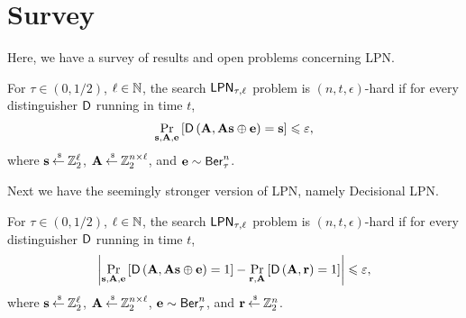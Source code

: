 \section{Survey}
Here, we have a survey of results and open problems concerning LPN.

\begin{definition}
	For $\tau \in (0,1/2)$, $\ell \in {\mathbb N}$, the search $\mathsf{LPN}_{\tau, \ell}$ problem is $(n, t, \epsilon)$-hard if for every distinguisher $\mathsf{D}$ running in time $t$,
	\begin{align*}
		\underset{\mathbf{s}, \mathbf{A}, \mathbf{e}}{\mathop{\mathrm{Pr}}}\left[\mathsf{D}\left(\mathbf{A}, \mathbf{As}\oplus\mathbf{e}\right)=\mathbf{s}\right] \leqslant \varepsilon,
	\end{align*}
	where $\mathbf{s} \mathbin{\stackrel{\mbox{\,\tiny \$}}{\gets}} {\mathbb Z}^\ell_2$, $\mathbf{A} \mathbin{\stackrel{\mbox{\,\tiny \$}}{\gets}} {\mathbb Z}^{n\times \ell}_2$, and $\mathbf{e} \sim \mathsf{Ber}^n_\tau$.
\end{definition}
Next we have the seemingly stronger version of LPN, namely Decisional LPN.
\begin{definition}
	For $\tau \in (0,1/2)$, $\ell \in {\mathbb N}$, the search $\mathsf{LPN}_{\tau, \ell}$ problem is $(n, t, \epsilon)$-hard if for every distinguisher $\mathsf{D}$ running in time $t$,
	\begin{align*}
	\abs{\underset{\vec{s}, \vec{A}, \vec{e}}{\pr}\left[\pred{D}\left(\vec{A}, \vec{As}\xor\vec{e}\right) = 1\right] -
	\underset{\vec{r}, \vec{A}}{\pr}\left[\pred{D}\left(\vec{A}, \vec{r} \right)=1\right] } \leq \epsilon,
	\end{align*}
	where $\mathbf{s} \mathbin{\stackrel{\mbox{\,\tiny \$}}{\gets}} {\mathbb Z}^\ell_2$, $\mathbf{A} \mathbin{\stackrel{\mbox{\,\tiny \$}}{\gets}} {\mathbb Z}^{n\times \ell}_2$, $\mathbf{e} \sim \mathsf{Ber}^n_\tau$, and $\mathbf{r}\mathbin{\stackrel{\mbox{\,\tiny \$}}{\gets}}{\mathbb Z}^n_2$.
\end{definition}


